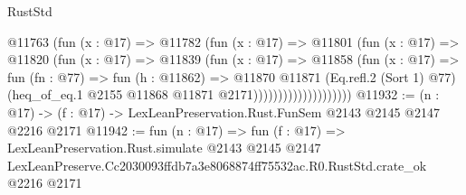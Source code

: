 \begin{lexlean}{RustStd}
\begin{coremodule}
                            @11763
                              (fun (x : @17) =>
                              @11782
                                (fun (x : @17) =>
                                @11801
                                  (fun (x : @17) =>
                                  @11820
                                    (fun (x : @17) =>
                                    @11839
                                      (fun (x : @17) =>
                                      @11858
                                        (fun (x : @17) =>
                                        fun (fn : @77) =>
                                        fun (h : @11862) =>
                                        @11870
                                          @11871
                                          (Eq.refl.{2} (Sort 1) @77)
                                          (heq_of_eq.{1}
                                            @2155
                                            @11868
                                            @11871
                                            @2171))))))))))))))))))))
@11932 := (n : @17) -> (f : @17) -> LexLeanPreservation.Rust.FunSem @2143 @2145 @2147 @2216 @2171
@11942 := fun (n : @17) =>
  fun (f : @17) =>
  LexLeanPreservation.Rust.simulate
    @2143
    @2145
    @2147
    LexLeanPreserve.Cc2030093ffdb7a3e8068874ff75532ac.R0.RustStd.crate_ok
    @2216
    @2171
\end{coremodule}
\end{lexlean}
